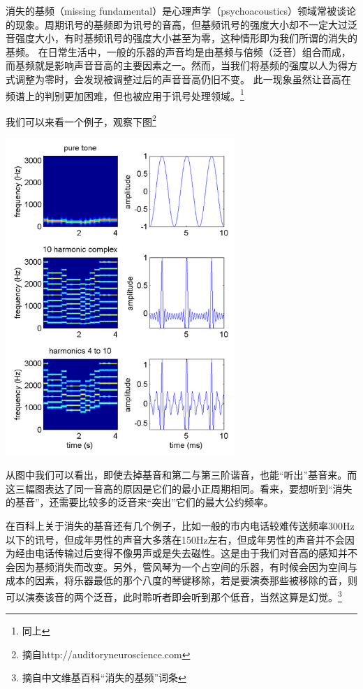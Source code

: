 \par
消失的基频（missing fundamental）是心理声学（psychoacoustics）领域常被谈论的现象。周期讯号的基频即为讯号的音高，但基频讯号的强度大小却不一定大过泛音强度大小，有时基频讯号的强度大小甚至为零，这种情形即为我们所谓的消失的基频。 在日常生活中，一般的乐器的声音均是由基频与倍频（泛音）组合而成，而基频就是影响声音音高的主要因素之一。然而，当我们将基频的强度以人为得方式调整为零时，会发现被调整过后的声音音高仍旧不变。 此一现象虽然让音高在频谱上的判别更加困难，但也被应用于讯号处理领域。\footnote{同上}
\par
我们可以来看一个例子，观察下图\footnote{摘自http://auditoryneuroscience.com}
\vspace{1cm}
\begin{center}
    \includegraphics[height=12cm]{triple.png}
\end{center}
\vspace{1cm}
\par 
从图中我们可以看出，即使去掉基音和第二与第三阶谐音，也能“听出”基音来。而这三幅图表达了同一音高的原因是它们的最小正周期相同。看来，要想听到“消失的基音”，还需要比较多的泛音来“突出”它们的最大公约频率。
\par
在百科上关于消失的基音还有几个例子，比如一般的市内电话较难传送频率300Hz以下的讯号，但成年男性的声音大多落在150Hz左右，但成年男性的声音并不会因为经由电话传输过后变得不像男声或是失去磁性。这是由于我们对音高的感知并不会因为基频消失而改变。另外，管风琴为一个占空间的乐器，有时候会因为空间与成本的因素，将乐器最低的那个八度的琴键移除，若是要演奏那些被移除的音，则可以演奏该音的两个泛音，此时聆听者即会听到那个低音，当然这算是幻觉。\footnote{摘自中文维基百科``消失的基频''词条}
